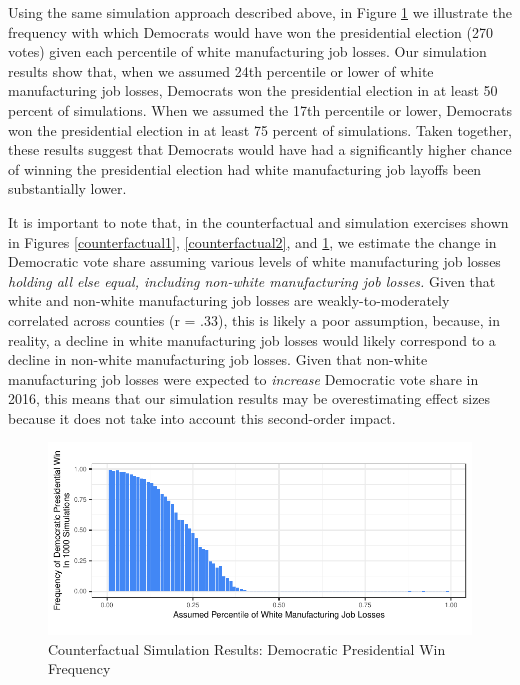 \documentclass[]{AEA}
\begin{document}
Using the same simulation approach described above, in Figure
\ref{counterfactual3} we illustrate the frequency with which Democrats
would have won the presidential election (270 votes) given each
percentile of white manufacturing job losses. Our simulation results
show that, when we assumed 24th percentile or lower of white
manufacturing job losses, Democrats won the presidential election in at
least 50 percent of simulations. When we assumed the 17th percentile or
lower, Democrats won the presidential election in at least 75 percent of
simulations. Taken together, these results suggest that Democrats would
have had a significantly higher chance of winning the presidential
election had white manufacturing job layoffs been substantially lower.

It is important to note that, in the counterfactual and simulation
exercises shown in Figures \ref{counterfactual1}, \ref{counterfactual2},
and \ref{counterfactual3}, we estimate the change in Democratic vote
share assuming various levels of white manufacturing job losses
\emph{holding all else equal, including non-white manufacturing job
losses.} Given that white and non-white manufacturing job losses are
weakly-to-moderately correlated across counties (r = .33), this is
likely a poor assumption, because, in reality, a decline in white
manufacturing job losses would likely correspond to a decline in
non-white manufacturing job losses. Given that non-white manufacturing
job losses were expected to \emph{increase} Democratic vote share in
2016, this means that our simulation results may be overestimating
effect sizes because it does not take into account this second-order
impact.

\FloatBarrier
\begin{figure} 
\caption{Counterfactual Simulation Results: Democratic Presidential Win Frequency}
\label{counterfactual3}

\begin{center}\includegraphics{Final-Draft_files/figure-latex/unnamed-chunk-8-1} \end{center}



\FloatBarrier
\end{figure}
\FloatBarrier
\end{document}
